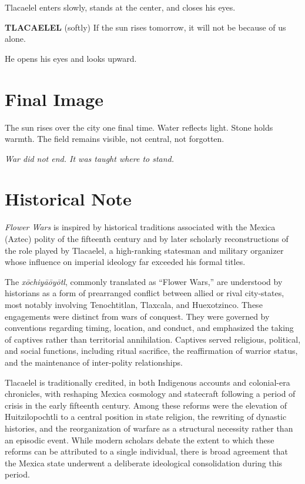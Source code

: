 \documentclass[12pt]{article}
\begin{document}
Tlacaelel enters slowly, stands at the center, and closes his eyes.

\textbf{TLACAELEL}  
(softly)  
If the sun rises tomorrow, it will not be because of us alone.

He opens his eyes and looks upward.

\section*{Final Image}

The sun rises over the city one final time. Water reflects light. Stone holds warmth. The field remains visible, not central, not forgotten.

\textit{War did not end.  
It was taught where to stand.}

\section*{Historical Note}

\textit{Flower Wars} is inspired by historical traditions associated with the Mexica (Aztec) polity of the fifteenth century and by later scholarly reconstructions of the role played by Tlacaelel, a high-ranking statesman and military organizer whose influence on imperial ideology far exceeded his formal titles.

The \textit{xōchiyāōyōtl}, commonly translated as “Flower Wars,” are understood by historians as a form of prearranged conflict between allied or rival city-states, most notably involving Tenochtitlan, Tlaxcala, and Huexotzinco. These engagements were distinct from wars of conquest. They were governed by conventions regarding timing, location, and conduct, and emphasized the taking of captives rather than territorial annihilation. Captives served religious, political, and social functions, including ritual sacrifice, the reaffirmation of warrior status, and the maintenance of inter-polity relationships.

Tlacaelel is traditionally credited, in both Indigenous accounts and colonial-era chronicles, with reshaping Mexica cosmology and statecraft following a period of crisis in the early fifteenth century. Among these reforms were the elevation of Huitzilopochtli to a central position in state religion, the rewriting of dynastic histories, and the reorganization of warfare as a structural necessity rather than an episodic event. While modern scholars debate the extent to which these reforms can be attributed to a single individual, there is broad agreement that the Mexica state underwent a deliberate ideological consolidation during this period.
\end{document}
